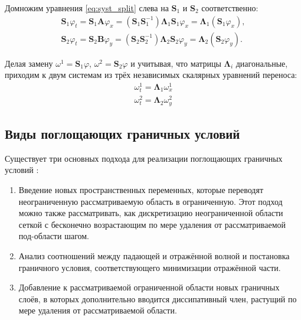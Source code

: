 Домножим уравнения \eqref{eq:syst_split} слева на $\pmb{S}_1$ и $\pmb{S}_2$ соответственно:
\begin{equation*}
\begin{gathered} 
	\pmb{S}_1\varphi_t = 
	\pmb{S}_1 \pmb{A} \varphi_x =
	\left(\pmb{S}_1 \pmb{S}_1^{-1}\right)\pmb{\Lambda}_1 \pmb{S}_1 \varphi_x =
	\pmb{\Lambda}_1 \left(\pmb{S}_1 \varphi_x \right) , \\
	\pmb{S}_2\varphi_t = 
	\pmb{S}_2 \pmb{B} \varphi_y = 
	\left(\pmb{S}_2 \pmb{S}_2^{-1}\right)\pmb{\Lambda}_2 \pmb{S}_2 \varphi_y =
	\pmb{\Lambda}_2 \left(\pmb{S}_2 \varphi_y \right) .
\end{gathered}
\end{equation*}

\noindent Делая замену $\omega^1 =  \pmb{S}_1 \varphi$, $\omega^2 = \pmb{S}_2 \varphi$ и учитывая, что матрицы $\pmb{\Lambda}_i$ диагональные, приходим к двум системам из трёх независимых скалярных уравнений переноса:
\begin{equation*}
\begin{gathered} 
	\omega^1_t = \pmb{\Lambda}_1 \omega^1_x\\
	\omega^2_t = \pmb{\Lambda}_2 \omega^2_y
\end{gathered}
\end{equation*}

\subsection{Виды поглощающих граничных условий}

Существует три основных подхода для реализации поглощающих граничных условий \cite{Trefethen1996FiniteDA, arch_comp_sim}:
\begin{enumerate}
    \item Введение новых пространственных переменных, которые переводят неограниченную рассматриваемую область в ограниченную. Этот подход можно также рассматривать, как дискретизацию неограниченной области сеткой с бесконечно возрастающим по мере удаления от рассматриваемой под-области шагом.
    \item Анализ соотношений между падающей и отражённой волной и постановка граничного условия, соответствующего минимизации отражённой части.
    \item Добавление к рассматриваемой ограниченной области новых граничных слоёв, в которых дополнительно вводится диссипативный член, растущий по мере удаления от рассматриваемой области.
\end{enumerate}

